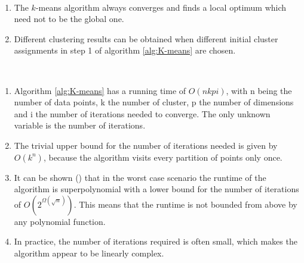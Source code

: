 \begin{remark}~
	\begin{enumerate}[label=(\roman*)]
		\item The $k$-means algorithm always converges and finds a local optimum which need not to be the global one.
		\item Different clustering results can be obtained when different initial cluster assignments in step 1 of algorithm \ref{alg:K-means} are chosen.
	\end{enumerate}
\end{remark}

\begin{remark}~
	\begin{enumerate}[label=(\roman*)]
		\item Algorithm \ref{alg:K-means} has a running time of $O(nkpi)$, with n being the number of data points, k the number of cluster, p the number of dimensions and i the number of iterations needed to converge. The only unknown variable is the number of iterations. 
		\item The trivial upper bound for the number of iterations needed is given by $O(k^n)$, because the algorithm visits every partition of points only once. 
		\item It can be shown (\cite{arthur2006slow}) that in the worst case scenario the runtime of the algorithm is superpolynomial with a lower bound for the number of iterations of $O(2^{\Omega(\sqrt{n})})$. This means that the runtime is not bounded from above by any polynomial function.
		\item In practice, the number of iterations required is often small, which makes the algorithm appear to be linearly complex.  
	\end{enumerate}
\end{remark}

